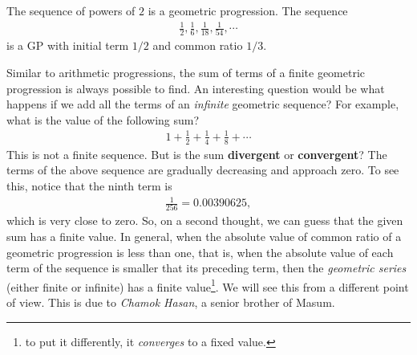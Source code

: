 \documentclass{subfile}
\begin{document}
	\begin{example}
		The sequence of powers of $2$ is a geometric progression. The sequence
			\begin{align*}
				\frac{1}{2}, \frac{1}{6}, \frac{1}{18}, \frac{1}{54}, \cdots
			\end{align*}
		is a GP with initial term $1/2$ and common ratio $1/3$.
	\end{example}
	
	Similar to arithmetic progressions, the sum of terms of a finite geometric progression is always possible to find. An interesting question would be what happens if we add all the terms of an \textit{infinite} geometric sequence? For example, what is the value of the following sum?
		\begin{align*}
			1 + \frac{1}{2}+ \frac{1}{4}+\frac{1}{8}+ \cdots
		\end{align*}
	This is not a finite sequence. But is the sum \textbf{divergent} or \textbf{convergent}? The terms of the above sequence are gradually decreasing and approach zero. To see this, notice that the ninth term is
		\begin{align*}
			\frac{1}{256} = 0.00390625,
		\end{align*}
	which is very close to zero. So, on a second thought, we can guess that the given sum has a finite value. In general, when the absolute value of common ratio of a geometric progression is less than one, that is, when the absolute value of each term of the sequence is smaller that its preceding term, then the \textit{geometric series} (either finite or infinite) has a finite value\footnote{to put it differently, it \textit{converges} to a fixed value.}. We will see this from a different point of view. This is due to \textit{Chamok Hasan}, a senior brother of Masum.
	
\end{document}
